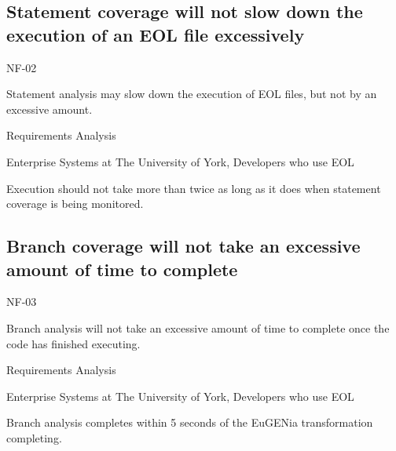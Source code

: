 \subsection{Statement coverage will not slow down the execution of an EOL file excessively}
\begin{description}[style=sameline,leftmargin=4.5cm,nolistsep]
\item[\hspace*{0.3cm}Label] NF-02
\item[\hspace*{0.3cm}Description] Statement analysis may slow down the execution of EOL files, but not by an excessive amount.
\item[\hspace*{0.3cm}Source] Requirements Analysis
\item[\hspace*{0.3cm}Stakeholders] Enterprise Systems at The University of York, Developers who use EOL
\item[\hspace*{0.3cm}Satisfiable Conditions] Execution should not take more than twice as long as it does when statement coverage is being monitored.
\end{description}

\subsection{Branch coverage will not take an excessive amount of time to complete}
\begin{description}[style=sameline,leftmargin=4.5cm,nolistsep]
\item[\hspace*{0.3cm}Label] NF-03
\item[\hspace*{0.3cm}Description] Branch analysis will not take an excessive amount of time to complete once the code has finished executing.
\item[\hspace*{0.3cm}Source] Requirements Analysis
\item[\hspace*{0.3cm}Stakeholders] Enterprise Systems at The University of York, Developers who use EOL
\item[\hspace*{0.3cm}Satisfiable Conditions] Branch analysis completes within 5 seconds of the EuGENia transformation completing.
\end{description}

